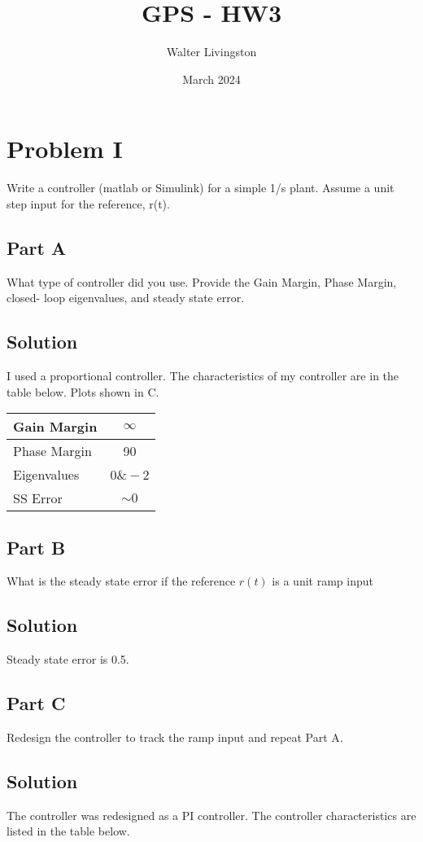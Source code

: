 \documentclass{article}
\title{GPS - HW3}
\author{Walter Livingston}
\date{March 2024}
\begin{document}
\maketitle

\section*{Problem I}
Write a controller (matlab or Simulink) for a simple 1/s plant. Assume a unit step input for
the reference, r(t).
\subsection*{Part A}
What type of controller did you use. Provide the Gain Margin, Phase Margin, closed-
loop eigenvalues, and steady state error.
\subsection*{Solution}
I used a proportional controller.  The characteristics of my controller are in the table below.  Plots shown in C.

\begin{center}
    \begin{tabular}{ | l | c | }
      \hline
      Gain Margin & $\infty$ \\ \hline
      Phase Margin & 90 \\ \hline
      Eigenvalues & $0 \& -2$ \\ \hline
      SS Error & $\sim 0$ \\ \hline
    \end{tabular}
\end{center}

\subsection*{Part B}
What is the steady state error if the reference $r(t)$ is a unit ramp input
\subsection*{Solution}
Steady state error is 0.5.
\subsection*{Part C}
Redesign the controller to track the ramp input and repeat Part A.
\subsection*{Solution}
The controller was redesigned as a PI controller.  The controller characteristics are listed in the table below.
\end{document}
